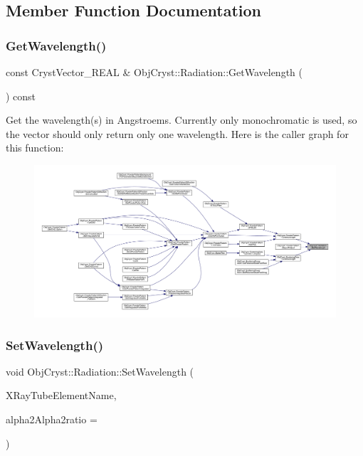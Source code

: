 \subsection{Member Function Documentation}
\mbox{\label{class_obj_cryst_1_1_radiation_a692ac2a7e9e4462e85479476f0485810}} 
\subsubsection{\texorpdfstring{GetWavelength()}{GetWavelength()}}
{\footnotesize\ttfamily const Cryst\+Vector\+\_\+\+R\+E\+AL \& Obj\+Cryst\+::\+Radiation\+::\+Get\+Wavelength (\begin{DoxyParamCaption}{ }\end{DoxyParamCaption}) const}

Get the wavelength(s) in Angstroems. Currently only monochromatic is used, so the vector should only return only one wavelength. Here is the caller graph for this function\+:
\nopagebreak
\begin{figure}[H]
\begin{center}
\leavevmode
\includegraphics[width=350pt]{class_obj_cryst_1_1_radiation_a692ac2a7e9e4462e85479476f0485810_icgraph}
\end{center}
\end{figure}
\mbox{\label{class_obj_cryst_1_1_radiation_a61393e596990f9fdac7dfc6d8acd91ac}} 
\subsubsection{\texorpdfstring{SetWavelength()}{SetWavelength()}}
{\footnotesize\ttfamily void Obj\+Cryst\+::\+Radiation\+::\+Set\+Wavelength (\begin{DoxyParamCaption}\item[{const string \&}]{X\+Ray\+Tube\+Element\+Name,  }\item[{const R\+E\+AL}]{alpha2\+Alpha2ratio = {} }\end{DoxyParamCaption})}


